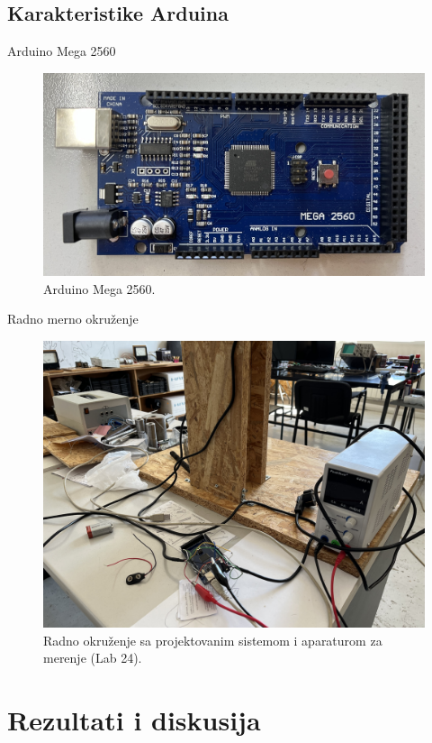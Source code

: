 \documentclass[aspectratio=169,xcolor=dvipsnames]{beamer}
\begin{document}

\subsection{Karakteristike Arduina}

\begin{frame}{Arduino Mega 2560}
    \begin{figure}
    \includegraphics[width=0.75\linewidth]{master_fig/mega2560_2.jpeg}
    \caption{Arduino Mega 2560.}
    \end{figure}
\end{frame}


\begin{frame}{Radno merno okruženje}
    \begin{figure}
    \includegraphics[width=0.6\linewidth]{fig/img/lab.jpeg}
    \caption{Radno okruženje sa projektovanim sistemom i aparaturom za merenje (Lab 24).}
    \end{figure}
\end{frame}


\section{Rezultati i diskusija}
\end{document}
